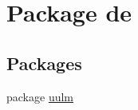 \hypertarget{namespacede}{\section{Package de}
\label{namespacede}
}
\subsection*{Packages}
\begin{DoxyCompactItemize}
\item 
package \hyperlink{namespacede_1_1uulm}{uulm}
\end{DoxyCompactItemize}
